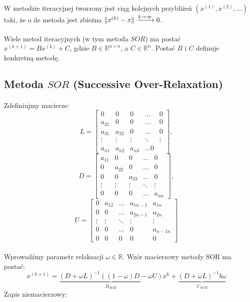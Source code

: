 \documentclass{article}
\DeclarePairedDelimiter{\norm}{\lVert}{\rVert}
\begin{document}
\paragraph{}
W metodzie iteracyjnej tworzony jest ciąg kolejnych przybliżeń 
\((x^{(1)}, x^{(2)},\dots)\)
taki, że o ile metoda jest zbieżna \(
\norm{x^{(k)}-x}\xrightarrow{k\rightarrow\infty}0
\).
\paragraph{}
Wiele metod iteracyjnych (w tym metoda $SOR$) ma postać \\ \(x^{(k+1)}=Bx^{(k)}+C\), gdzie \(B\in \mathbb{R}^{n\times n}\), a \(C\in\mathbb{R}^{n}\). Postać $B$ i $C$ definuje konkretną metodę.
\subsection {Metoda $SOR$ (Successive Over-Relaxation)}
\paragraph{}
Zdefiniujmy macierze:
\[
L = \begin{bmatrix}
  0 & 0 & 0 & \dots &0\\
  a_{21} &0 & 0 & \dots & 0\\
  a_{31} & a_{32} &0  & \dots & 0\\
 \vdots & \vdots &\vdots & \ddots & \vdots \\
  a_{n1} & a_{n2} &a_{n3} & \dots 0
\end{bmatrix},\]
\[
D = \begin{bmatrix}
  a_{11} & 0 & 0 & \dots &0\\
  0 & a_{22} & 0 & \dots & 0\\
  0 & 0  & a_{33} & \dots & 0\\
 \vdots & \vdots &\vdots & \ddots & \vdots \\
  0 & 0 & 0 & \dots & a_{nn}
\end{bmatrix},\]
\[
U = \begin{bmatrix}
  0 & a_{12} & \dots & a_{1n-1} & a_{1n} \\
  0 & 0 & \dots &  a_{2n-1} & a_{2n}\\
 \vdots & \vdots &\ddots & \vdots & \vdots \\
  0 & 0  &\dots &  0 & a_{n-1n}\\
  0 & 0 & 0 & 0 & 0
\end{bmatrix}
 \]
\paragraph{}
Wprowadźmy parametr relaksacji $\omega \in \mathbb{R}$.
Wzór macierzowy metody SOR ma postać:
\[
x^{(k+1)}=\underbrace{(D+\omega L)^{-1}((1-\omega)D-\omega U)}_{B_{SOR}}x^k + \underbrace{(D+ \omega L)^{-1}b\omega}_{C_{SOR}}
\]
Zapis niemacierzowy:
\begin{algorithmic}
\end{algorithmic}
\end{document}
